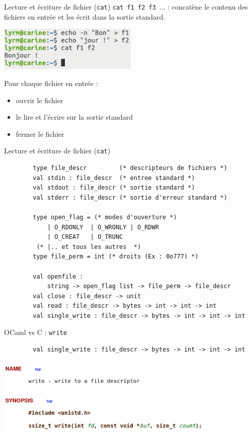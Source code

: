 \begin{frame}[fragile]{Lecture et écriture de fichier (\texttt{cat})}
    \texttt{cat f1 f2 f3}~... : concatène le contenu des fichiers en entrée et les écrit dans la sortie standard.
    
    
    \includegraphics[width=0.5\textwidth]{slides/images/shell_cat.png}
    
    \pause{}

    Pour chaque fichier en entrée : 
    \begin{itemize}[label=\small{}]
        \item ouvrir le fichier
        \item le lire et l'écrire sur la sortie standard
        \item fermer le fichier
    \end{itemize}
\end{frame}

\begin{frame}[fragile]{Lecture et écriture de fichier (\texttt{cat})}
    \begin{lstlisting}
        type file_descr         (* descripteurs de fichiers *)
        val stdin : file_descr  (* entree standard *)
        val stdout : file_descr (* sortie standard *)
        val stderr : file_descr (* sortie d'erreur standard *)
        
        type open_flag = (* modes d'ouverture *)
            | O_RDONLY  | O_WRONLY | O_RDWR
            | O_CREAT   | O_TRUNC 
         (* |.. et tous les autres  *)
        type file_perm = int (* droits (Ex : 0o777) *)
        
        val openfile : 
            string -> open_flag list -> file_perm -> file_descr
        val close : file_descr -> unit
        val read : file_descr -> bytes -> int -> int -> int
        val single_write : file_descr -> bytes -> int -> int -> int
    \end{lstlisting}
\end{frame}

\begin{frame}[fragile]{OCaml vs C : \texttt{write}}
    \begin{lstlisting}
        val single_write : file_descr -> bytes -> int -> int -> int    
    \end{lstlisting}
    
    \includegraphics[width=0.8\textwidth]{slides/images/c_api_write.png}
\end{frame}

